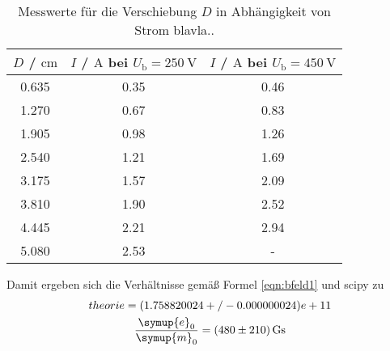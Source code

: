 \begin{table}
	\caption{Messwerte für die Verschiebung $D$ in Abhängigkeit von Strom blavla..}
	\label{tab:bfeldtab}
	\centering
	\begin{tabular}{ccc}
	\toprule
		$D$ / $\si{\centi\meter}$ & $I$ / $\si{\ampere}$ bei $U_{\mathrm{b}}=\SI{250}{\volt}$ & $I$ / $\si{\ampere}$ bei $U_{\mathrm{b}}=\SI{450}{\volt}$ \\
	\midrule
		0.635 & 0.35 & 0.46 \\
		1.270 & 0.67 & 0.83 \\
		1.905 & 0.98 & 1.26 \\
		2.540 & 1.21 & 1.69 \\
		3.175 & 1.57 & 2.09 \\
		3.810 & 1.90 & 2.52 \\
		4.445 & 2.21 & 2.94 \\
		5.080 & 2.53 & - \\
	\bottomrule
	\end{tabular}
\end{table}
Damit ergeben sich die Verhältnisse gemäß Formel \eqref{eqn:bfeld1} und scipy \cite{scipy} zu
\begin{gather*}
	theorie =  (1.758820024+/-0.000000024)e+11 \\
	\frac{\symup{e}_0}{\symup{m}_0} = \SI{480(210)}{\giga\second}
\end{gather*}
